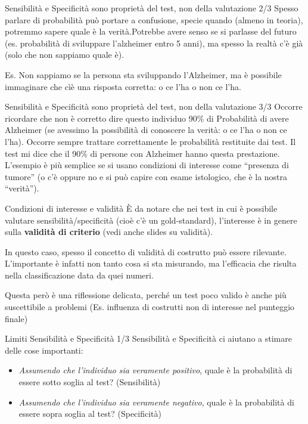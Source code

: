 \documentclass[
  ignorenonframetext,
]{beamer}
\begin{document}
\begin{frame}{\small Sensibilità e Specificità sono proprietà del test,
non della valutazione 2/3}
\label{sensibilituxe0-e-specificituxe0-sono-proprietuxe0-del-test-non-della-valutazione-23}
Spesso parlare di probabilità può portare a confusione, specie quando
(almeno in teoria), potremmo sapere quale è la verità.Potrebbe avere
senso se si parlasse del futuro (es. probabilità di sviluppare
l'alzheimer entro 5 anni), ma spesso la realtà c'è già (solo che non
sappiamo quale è).

Es. Non sappiamo se la persona sta sviluppando l'Alzheimer, ma è
possibile immaginare che cìè una risposta corretta: o ce l'ha o non ce
l'ha.
\end{frame}

\begin{frame}{\small Sensibilità e Specificità sono proprietà del test,
non della valutazione 3/3}
\label{sensibilituxe0-e-specificituxe0-sono-proprietuxe0-del-test-non-della-valutazione-33}
Occorre ricordare che non è corretto dire questo individuo 90\% di
Probabilità di avere Alzheimer (se avessimo la possibilità di conoscere
la verità: o ce l'ha o non ce l'ha). Occorre sempre trattare
correttamente le probabilità restituite dai test. Il test mi dice che il
90\% di persone con Alzheimer hanno questa prestazione. L'esempio è più
semplice se si usano condizioni di interesse come ``presenza di tumore''
(o c'è oppure no e si può capire con esame istologico, che è la nostra
``verità'').
\end{frame}

\begin{frame}{Condizioni di interesse e validità}
\label{condizioni-di-interesse-e-validituxe0}
È da notare che nei test in cui è possibile valutare
sensibilità/specificità (cioè c'è un gold-standard), l'interesse è in
genere sulla \textbf{validità di criterio} (vedi anche slides su
validità).

In questo caso, spesso il concetto di validità di costrutto può essere
rilevante. L'importante è infatti non tanto cosa si sta misurando, ma
l'efficacia che risulta nella classificazione data da quei numeri.

Questa però è una riflessione delicata, perché un test poco valido è
anche più suscettibile a problemi (Es. influenza di costrutti non di
interesse nel punteggio finale)
\end{frame}

\begin{frame}{Limiti Sensibilità e Specificità 1/3}
\label{limiti-sensibilituxe0-e-specificituxe0-13}
Sensibilità e Specificità ci aiutano a stimare delle cose importanti:

\begin{itemize}
\small
\item \emph{Assumendo che l'individuo sia veramente positivo}, quale è la probabilità di essere sotto soglia al test? (Sensibilità)
\item \emph{Assumendo che l'individuo sia veramente negativo}, quale è la probabilità di essere sopra soglia al test? (Specificità) 
\end{itemize}
\end{frame}
\end{document}
